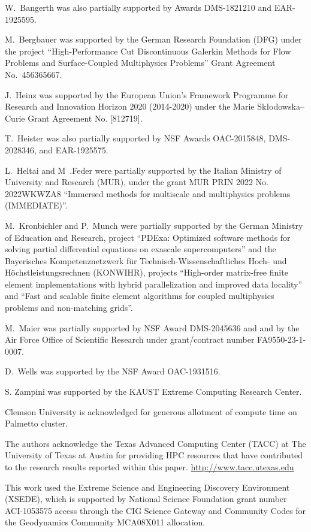 \documentclass{ansarticle-preprint}
\begin{document}
W.~Bangerth was also partially supported by Awards DMS-1821210 and EAR-1925595.

M.~Bergbauer was supported by the German Research Foundation (DFG) under the
project ``High-Performance Cut Discontinuous Galerkin Methods for Flow
Problems and Surface-Coupled Multiphysics Problems'' Grant Agreement
No.~456365667.

J.~Heinz was supported by the European Union’s Framework Programme for Research
and Innovation Horizon 2020 (2014-2020) under the Marie Sk\l{}odowska--Curie Grant
Agreement No. [812719].

T.~Heister was also partially supported by NSF
Awards OAC-2015848, DMS-2028346, and
EAR-1925575.

L.~Heltai and M~.Feder were partially supported by the Italian Ministry of
University and Research (MUR), under the grant MUR PRIN 2022 No. 2022WKWZA8
``Immersed methods for multiscale and multiphysics problems (IMMEDIATE)''.

M.~Kronbichler and P.~Munch were partially supported by the
German Ministry of Education and Research, project
``PDExa: Optimized software methods for solving partial differential
equations on exascale supercomputers'' and the Bayerisches Kompetenznetzwerk
f\"ur Technisch-Wissen\-schaft\-li\-ches Hoch- und H\"ochstleistungsrechnen
(KONWIHR), projects ``High-order matrix-free finite
element implementations with hybrid parallelization and improved data
locality'' and ``Fast and scalable finite element algorithms for coupled
multiphysics problems and non-matching grids''.

M.~Maier was partially supported by NSF Award DMS-2045636 and and by the
Air Force Office of Scientific Research under grant/contract number
FA9550-23-1-0007.

D.~Wells was supported by the NSF Award OAC-1931516.

S. Zampini was supported by the KAUST Extreme Computing Research Center.

Clemson University is acknowledged for generous allotment of compute time on Palmetto cluster.

The authors acknowledge the Texas Advanced Computing Center (TACC) at The University of Texas at Austin for providing HPC resources that have contributed to the research results reported within this paper. \url{http://www.tacc.utexas.edu}

This work used the Extreme Science and Engineering Discovery Environment (XSEDE), which is supported by National Science Foundation grant number ACI-1053575 access through the CIG Science Gateway and Community Codes for the Geodynamics Community MCA08X011 allocation.


{}

\end{document}
